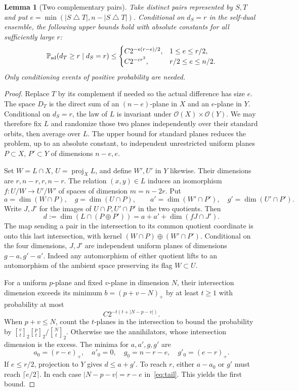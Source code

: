 \documentclass[11pt,letterpaper]{article}
\newtheorem{lemma}[theorem]{Lemma}
\newcommand{\ga}[2]{\genfrac{[}{]}{0pt}{}{#1}{#2}_{\!2}}
\newcommand{\rgp}{\mathcal O}
\begin{document}
\begin{lemma}[Two complementary pairs]\label{lem:pair}
Take distinct pairs represented by $S,T$ and put $e=\min(|S\mathbin\triangle T|,n-|S\mathbin\triangle T|)$. Conditional on $d_S=r$ in the self-dual ensemble, the following upper bounds hold with absolute constants for all sufficiently large $r$:
\[
 \mathbb P_{\rm sd}(d_T\ge r\mid d_S=r)\le
 \begin{cases}
 C2^{-e(r-e)/2},&1\le e\le r/2,\\
 C2^{-c r^2},&r/2\le e\le n/2.
 \end{cases}
\]
Only conditioning events of positive probability are needed.
\end{lemma}
\begin{proof}
Replace $T$ by its complement if needed so the actual difference has size $e$. The space $D_T$ is the direct sum of an $(n-e)$-plane in $X$ and an $e$-plane in $Y$. Conditional on $d_S=r$, the law of $L$ is invariant under $\rgp(X)\times\rgp(Y)$. We may therefore fix $L$ and randomize those two planes independently over their standard orbits, then average over $L$. The upper bound for standard planes reduces the problem, up to an absolute constant, to independent unrestricted uniform planes $P\subset X$, $P'\subset Y$ of dimensions $n-e,e$.

Set $W=L\cap X$, $U=\operatorname{proj}_X L$, and define $W',U'$ in $Y$ likewise. Their dimensions are $r,n-r,r,n-r$. The relation $(x,y)\in L$ induces an isomorphism $f:U/W\to U'/W'$ of spaces of dimension $m=n-2r$. Put
\[
 a=\dim(W\cap P),\quad g=\dim(U\cap P),\qquad
 a'=\dim(W'\cap P'),\quad g'=\dim(U'\cap P').
\]
Write $J,J'$ for the images of $U\cap P,U'\cap P'$ in the two quotients. Then
\begin{equation}\label{eq:residual}
 d:=\dim(L\cap (P\oplus P'))=a+a'+\dim(fJ\cap J').
\end{equation}
The map sending a pair in the intersection to its common quotient coordinate is onto this last intersection, with kernel $(W\cap P)\oplus(W'\cap P')$. Conditional on the four dimensions, $J,J'$ are independent uniform planes of dimensions $g-a,g'-a'$. Indeed any automorphism of either quotient lifts to an automorphism of the ambient space preserving its flag $W\subset U$.

For a uniform $p$-plane and fixed $v$-plane in dimension $N$, their intersection dimension exceeds its minimum $b=(p+v-N)_+$ by at least $t\ge1$ with probability at most
\begin{equation}\label{eq:tail}
 C2^{-t(t+|N-p-v|)} .
\end{equation}
When $p+v\le N$, count the $t$-planes in the intersection to bound the probability by $\ga vt\ga pt/\ga Nt$. Otherwise use the annihilators, whose intersection dimension is the excess. The minima for $a,a',g,g'$ are
\[
 a_0=(r-e)_+,\quad a'_0=0,\quad g_0=n-r-e,\quad g'_0=(e-r)_+ .
\]
If $e\le r/2$, projection to $Y$ gives $d\le a+g'$. To reach $r$, either $a-a_0$ or $g'$ must reach $\lceil e/2\rceil$. In each case $|N-p-v|=r-e$ in~\eqref{eq:tail}. This yields the first bound.


\end{proof}
\end{document}
